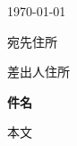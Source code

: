 \documentclass[a4paper]{jsarticle}
\newcommand{\issueDate}{\today}
\newcommand{\subject}{件名}
\newcommand{\toAddress}{宛先住所}
\newcommand{\fromAddress}{差出人住所}
\newcommand{\body}{本文}
\begin{document}
\begin{flushright}\issueDate\end{flushright}
\begin{flushleft}\toAddress\end{flushleft}
\begin{flushright}\fromAddress\end{flushright}
\vspace{25pt}
\begin{center}\bfseries\Large\subject\end{center}
\vspace{25pt}
\par
\body
\end{document}
